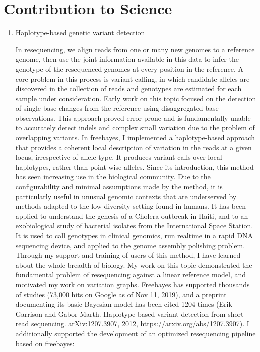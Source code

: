 \documentclass{nihbiosketch}
\begin{document}


\section{Contribution to Science}

\begin{enumerate}

\item Haplotype-based genetic variant detection
  
In resequencing, we align reads from one or many new genomes to a reference genome, then use the joint information available in this data to infer the genotype of the resequenced genomes at every position in the reference. A core problem in this process is variant calling, in which candidate alleles are discovered in the collection of reads and genotypes are estimated for each sample under consideration. Early work on this topic focused on the detection of single base changes from the reference using disaggregated base observations. This approach proved error-prone and is fundamentally unable to accurately detect indels and complex small variation due to the problem of overlapping variants. In freebayes, I implemented a haplotype-based approach that provides a coherent local description of variation in the reads at a given locus, irrespective of allele type. It produces variant calls over local haplotypes, rather than point-wise alleles. Since its introduction, this method has seen increasing use in the biological community. Due to the configurability and minimal assumptions made by the method, it is particularly useful in unusual genomic contexts that are underserved by methods adapted to the low diversity setting found in humans. It has been applied to understand the genesis of a Cholera outbreak in Haiti, and to an exobiological study of bacterial isolates from the International Space Station. It is used to call genotypes in clinical genomics, run realtime in a rapid DNA sequencing device, and applied to the genome assembly polishing problem. Through my support and training of users of this method, I have learned about the whole breadth of biology. My work on this topic demonstrated the fundamental problem of resequencing against a linear reference model, and motivated my work on variation graphs. Freebayes has supported thousands of studies (73,000 hits on Google as of Nov 11, 2019), and a preprint documenting its basic Bayesian model has been cited 1204 times (Erik Garrison and Gabor Marth. Haplotype-based variant detection from short-read sequencing. arXiv:1207.3907, 2012, \url{https://arxiv.org/abs/1207.3907}). I additionally supported the development of an optimized resequencing pipeline based on freebayes:


\end{enumerate}
\end{document}
